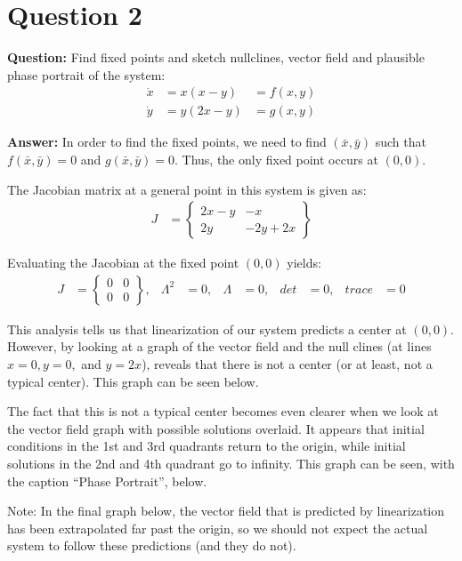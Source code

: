 \documentclass[12pt]{article}
\newenvironment{myenv}{\begin{adjustwidth}{1cm}{}}{\end{adjustwidth}}
\begin{document}
\section*{Question 2}
\begin{myenv}
\textbf{Question:} Find fixed points and sketch nullclines, vector field and plausible phase portrait of the system:
\begin{alignat*}{3}
\dot{x} &= x(x-y) &= f(x,y) \\
\dot{y} &= y(2x-y) &= g(x,y)
\end{alignat*}


\textbf{Answer:} In order to find the fixed points, we need to find $(\bar{x},\bar{y})$ such that $f(\bar{x},\bar{y}) = 0$ and $g(\bar{x},\bar{y}) = 0$. Thus, the only fixed point occurs at $(0,0)$.

The Jacobian matrix at a general point in this system is given as:
\begin{align*}
	J &= 
	\begin{Bmatrix}
	2x-y & -x \\
	2y & -2y + 2x
	\end{Bmatrix}
\end{align*}

Evaluating the Jacobian at the fixed point $(0,0)$ yields:
\begin{align*}
	J &= 
	\begin{Bmatrix}
	0 & 0 \\
	0 & 0
	\end{Bmatrix}, 	&\Lambda^2 &= 0,	&\Lambda &= 0, &det &= 0, &trace &= 0
\end{align*}


This analysis tells us that linearization of our system predicts a center at $(0,0)$. However, by looking at a graph of the vector field and the null clines (at lines $x = 0, y = 0,$ and $y = 2x$), reveals that there is not a center (or at least, not a typical center). This graph can be seen below. 

The fact that this is not a typical center becomes even clearer when we look at the vector field graph with possible solutions overlaid. It appears that initial conditions in the 1st and 3rd quadrants return to the origin, while initial solutions in the 2nd and 4th quadrant go to infinity. This graph can be seen, with the caption ``Phase Portrait'', below.

Note: In the final graph below, the vector field that is predicted by linearization has been extrapolated far past the origin, so we should not expect the actual system to follow these predictions (and they do not).




\end{myenv}
\end{document}
